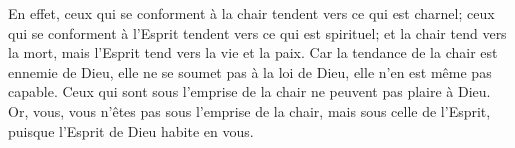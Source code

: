 En effet, ceux qui se conforment à la chair tendent vers ce qui est charnel;
	ceux qui se conforment à l’Esprit tendent vers ce qui est spirituel;
	et la chair tend vers la mort, mais l’Esprit tend vers la vie et la paix.
Car la tendance de la chair est ennemie de Dieu,
	elle ne se soumet pas à la loi de Dieu, elle n’en est même pas capable.
Ceux qui sont sous l’emprise de la chair ne peuvent pas plaire à Dieu.
Or, vous, vous n’êtes pas sous l’emprise de la chair,
	mais sous celle de l’Esprit, puisque l’Esprit de Dieu habite en vous.
